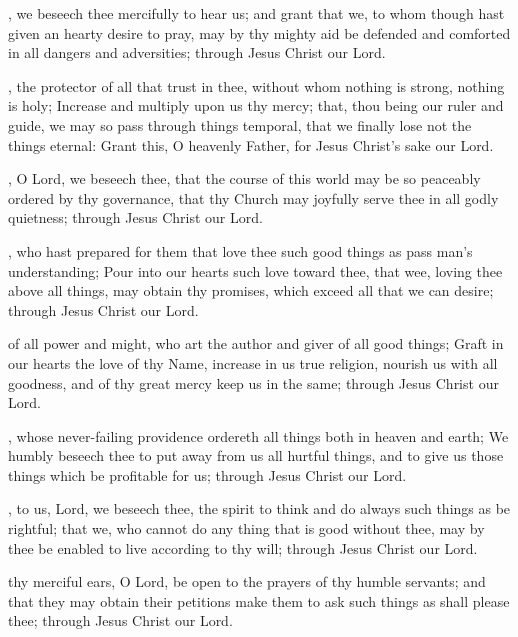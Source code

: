 , we beseech thee mercifully to hear us; and grant that we, to whom though hast given an hearty desire to pray, may by thy mighty aid be defended and comforted in all dangers and adversities; through Jesus Christ our Lord.

, the protector of all that trust in thee, without whom nothing is strong, nothing is holy; Increase and multiply upon us thy mercy; that, thou being our ruler and guide, we may so pass through things temporal, that we finally lose not the things eternal: Grant this, O heavenly Father, for Jesus Christ's sake our Lord.

, O Lord, we beseech thee, that the course of this world may be so peaceably ordered by thy governance, that thy Church may joyfully serve thee in all godly quietness; through Jesus Christ our Lord.

, who hast prepared for them that love thee such good things as pass man's understanding; Pour into our hearts such love toward thee, that wee, loving thee above all things, may obtain thy promises, which exceed all that we can desire; through Jesus Christ our Lord.

 of all power and might, who art the author and giver of all good things; Graft in our hearts the love of thy Name, increase in us true religion, nourish us with all goodness, and of thy great mercy keep us in the same; through Jesus Christ our Lord.

, whose never-failing providence ordereth all things both in heaven and earth; We humbly beseech thee to put away from us all hurtful things, and to give us those things which be profitable for us; through Jesus Christ our Lord.

, to us, Lord, we beseech thee, the spirit to think and do always such things as be rightful; that we, who cannot do any thing that is good without thee, may by thee be enabled to live according to thy will; through Jesus Christ our Lord.

 thy merciful ears, O Lord, be open to the prayers of thy humble servants; and that they may obtain their petitions make them to ask such things as shall please thee; through Jesus Christ our Lord.

